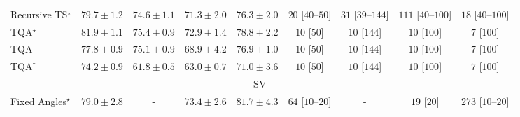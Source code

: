 \begin{tabular}{l|cccc|cccc|}
Recursive TS$^\star$ & {\cellcolor[HTML]{006034}} \color[HTML]{F1F1F1} $79.7\pm 1.2$ & {\cellcolor[HTML]{349A52}} \color[HTML]{F1F1F1} $74.6\pm 1.1$ & {\cellcolor[HTML]{69BF72}} \color[HTML]{000000} $71.3\pm 2.0$ & {\cellcolor[HTML]{228343}} \color[HTML]{F1F1F1} $76.3\pm 2.0$ & {\cellcolor[HTML]{FFF4F0}} \color[HTML]{000000} $20$ [$40$--$50$] & {\cellcolor[HTML]{FFF2EE}} \color[HTML]{000000} $31$ [$39$--$144$] & {\cellcolor[HTML]{FDE0DD}} \color[HTML]{000000} $111$ [$40$--$100$] & {\cellcolor[HTML]{FFF5F1}} \color[HTML]{000000} $18$ [$40$--$100$] \\
TQA$^\star$ & {\cellcolor[HTML]{004629}} \color[HTML]{F1F1F1} $81.9\pm 1.1$ & {\cellcolor[HTML]{2C8F4B}} \color[HTML]{F1F1F1} $75.4\pm 0.9$ & {\cellcolor[HTML]{4AB062}} \color[HTML]{F1F1F1} $72.9\pm 1.4$ & {\cellcolor[HTML]{036B38}} \color[HTML]{F1F1F1} $78.8\pm 2.2$ & {\cellcolor[HTML]{FFF7F3}} \color[HTML]{000000} $10$ [$50$] & {\cellcolor[HTML]{FFF7F3}} \color[HTML]{000000} $10$ [$144$] & {\cellcolor[HTML]{FFF7F3}} \color[HTML]{000000} $10$ [$100$] & {\cellcolor[HTML]{FFF7F3}} \color[HTML]{000000} $7$ [$100$] \\
TQA & {\cellcolor[HTML]{10743C}} \color[HTML]{F1F1F1} $77.8\pm 0.9$ & {\cellcolor[HTML]{2F934D}} \color[HTML]{F1F1F1} $75.1\pm 0.9$ & {\cellcolor[HTML]{95D385}} \color[HTML]{000000} $68.9\pm 4.2$ & {\cellcolor[HTML]{1A7D40}} \color[HTML]{F1F1F1} $76.9\pm 1.0$ & {\cellcolor[HTML]{FFF7F3}} \color[HTML]{000000} $10$ [$50$] & {\cellcolor[HTML]{FFF7F3}} \color[HTML]{000000} $10$ [$144$] & {\cellcolor[HTML]{FFF7F3}} \color[HTML]{000000} $10$ [$100$] & {\cellcolor[HTML]{FFF7F3}} \color[HTML]{000000} $7$ [$100$] \\
TQA$^\dagger$ & {\cellcolor[HTML]{389F55}} \color[HTML]{F1F1F1} $74.2\pm 0.9$ & {\cellcolor[HTML]{F7FCBA}} \color[HTML]{000000} $61.8\pm 0.5$ & {\cellcolor[HTML]{ECF7B1}} \color[HTML]{000000} $63.0\pm 0.7$ & {\cellcolor[HTML]{6FC174}} \color[HTML]{000000} $71.0\pm 3.6$ & {\cellcolor[HTML]{FFF7F3}} \color[HTML]{000000} $10$ [$50$] & {\cellcolor[HTML]{FFF7F3}} \color[HTML]{000000} $10$ [$144$] & {\cellcolor[HTML]{FFF7F3}} \color[HTML]{000000} $10$ [$100$] & {\cellcolor[HTML]{FFF7F3}} \color[HTML]{000000} $7$ [$100$] \\
\cline{1-9}
\multicolumn{9}{c}{\rule{0pt}{8pt}SV} \\
\midrule
Fixed Angles$^\star$ & {\cellcolor[HTML]{045B8E}} \color[HTML]{F1F1F1} $79.0\pm 2.8$ & {\cellcolor[HTML]{000000}} \color[HTML]{F1F1F1} {\cellcolor{white}} \color{black} - & {\cellcolor[HTML]{358FC0}} \color[HTML]{F1F1F1} $73.4\pm 2.6$ & {\cellcolor[HTML]{023B5D}} \color[HTML]{F1F1F1} $81.7\pm 4.3$ & {\cellcolor[HTML]{FEEBE7}} \color[HTML]{000000} $64$ [$10$--$20$] & {\cellcolor[HTML]{000000}} \color[HTML]{F1F1F1} {\cellcolor{white}} \color{black} - & {\cellcolor[HTML]{FFF5F1}} \color[HTML]{000000} $19$ [$20$] & {\cellcolor[HTML]{FBAFBA}} \color[HTML]{000000} $273$ [$10$--$20$] \\

\end{tabular}
